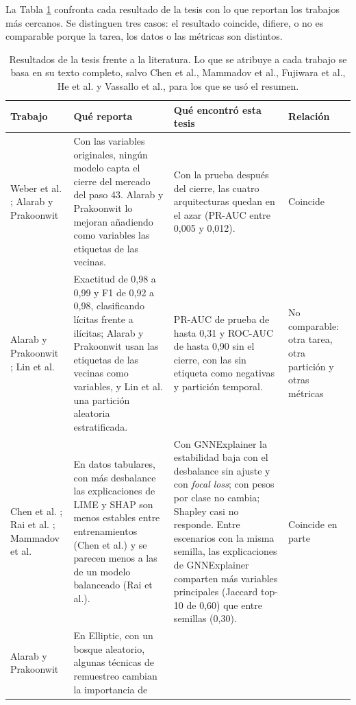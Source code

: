 La Tabla \ref{tab:literatura} confronta cada resultado de la tesis con lo que reportan los
trabajos más cercanos. Se distinguen tres casos: el resultado coincide, difiere, o no es
comparable porque la tarea, los datos o las métricas son distintos.

\begin{table}[ht]
\centering
\caption{Resultados de la tesis frente a la literatura. Lo que se atribuye a cada trabajo se
basa en su texto completo, salvo Chen et al., Mammadov et al., Fujiwara et al., He et al. y
Vassallo et al., para los que se usó el resumen.}
\label{tab:literatura}
\scriptsize
\renewcommand{\arraystretch}{1.25}
\begin{tabularx}{\textwidth}{p{}XXp{}}
\toprule
Trabajo & Qué reporta & Qué encontró esta tesis & Relación \\
\midrule
Weber et al. \cite{Weber2019Elliptic}; Alarab y Prakoonwit \cite{Alarab2023Recurrent} &
Con las variables originales, ningún modelo capta el cierre del mercado del paso 43. Alarab y
Prakoonwit lo mejoran añadiendo como variables las etiquetas de las vecinas. &
Con la prueba después del cierre, las cuatro arquitecturas quedan en el azar (PR-AUC entre 0,005
y 0,012). & Coincide \\
Alarab y Prakoonwit \cite{Alarab2023Recurrent}; Lin et al. \cite{Lin2026Detecting} &
Exactitud de 0,98 a 0,99 y F1 de 0,92 a 0,98, clasificando lícitas frente a ilícitas;
Alarab y Prakoonwit usan las etiquetas de las vecinas como variables, y Lin et al. una partición
aleatoria estratificada. &
PR-AUC de prueba de hasta 0,31 y ROC-AUC de hasta 0,90 sin el cierre, con las sin etiqueta como
negativas y partición temporal. & No comparable: otra tarea, otra partición y otras métricas \\
Chen et al. \cite{Chen2023CreditImbalance}; Rai et al. \cite{Rai2025Evaluating}; Mammadov et
al. \cite{TEM2026Stability} &
En datos tabulares, con más desbalance las explicaciones de LIME y SHAP son menos estables
entre entrenamientos (Chen et al.) y se parecen menos a las de un modelo balanceado (Rai et al.). &
Con GNNExplainer la estabilidad baja con el desbalance sin ajuste y con \textit{focal loss}; con
pesos por clase no cambia; Shapley casi no responde. Entre escenarios con la misma semilla, las
explicaciones de GNNExplainer comparten más variables principales (Jaccard top-10 de 0,60) que
entre semillas (0,30). & Coincide en parte \\
Alarab y Prakoonwit \cite{Alarab2022Resampling} &
En Elliptic, con un bosque aleatorio, algunas técnicas de remuestreo cambian la importancia de

\end{tabularx}
\end{table}
